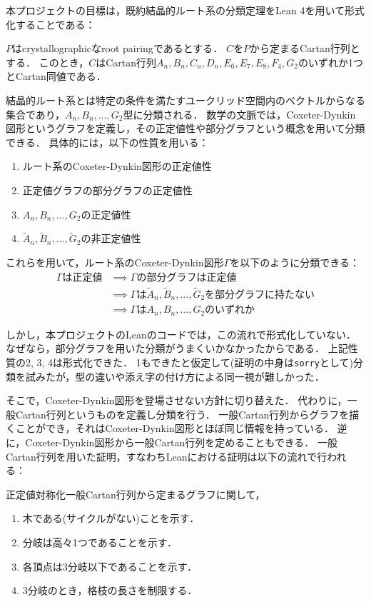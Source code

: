 本プロジェクトの目標は，既約結晶的ルート系の分類定理をLean 4を用いて形式化することである：
\begin{theorem*}
  \label{thm:classification_root}
  \leanok
  \uses{}
  $P$はcrystallographicなroot pairingであるとする．
  $C$を$P$から定まるCartan行列とする．
  このとき，$C$はCartan行列$A_n, B_n, C_n, D_n, E_6, E_7, E_8, F_4, G_2$のいずれか1つとCartan同値である．
\end{theorem*}
結晶的ルート系とは特定の条件を満たすユークリッド空間内のベクトルからなる集合であり，$A_n, B_n, \ldots, G_2$型に分類される．
数学の文脈では，Coxeter-Dynkin図形というグラフを定義し，その正定値性や部分グラフという概念を用いて分類できる．
具体的には，以下の性質を用いる：
\begin{enumerate}
  \item ルート系のCoxeter-Dynkin図形の正定値性
  \item 正定値グラフの部分グラフの正定値性
  \item $A_n, B_n, \ldots, G_2$の正定値性
  \item $\widetilde{A}_n, \widetilde{B}_n, \ldots, \widetilde{G}_2$の非正定値性
\end{enumerate}
これらを用いて，ルート系のCoxeter-Dynkin図形$\Gamma$を以下のように分類できる：
\begin{align}
  \Gamma \textrm{は正定値}
  &\implies \Gamma \textrm{の部分グラフは正定値} \\
  &\implies \Gamma \textrm{は} \widetilde{A}_n, \widetilde{B}_n, \ldots, \widetilde{G}_2 \textrm{を部分グラフに持たない} \\
  &\implies \Gamma \textrm{は} A_n, B_n, \ldots, G_2 \textrm{のいずれか}
\end{align}

しかし，本プロジェクトのLeanのコードでは，この流れで形式化していない．
なぜなら，部分グラフを用いた分類がうまくいかなかったからである．
上記性質の2, 3, 4は形式化できた．
1もできたと仮定して(証明の中身は\texttt{sorry}として)分類を試みたが，型の違いや添え字の付け方による同一視が難しかった．

そこで，Coxeter-Dynkin図形を登場させない方針に切り替えた．
代わりに，一般Cartan行列というものを定義し分類を行う．
一般Cartan行列からグラフを描くことができ，それはCoxeter-Dynkin図形とほぼ同じ情報を持っている．
逆に，Coxeter-Dynkin図形から一般Cartan行列を定めることもできる．
一般Cartan行列を用いた証明，すなわちLeanにおける証明は以下の流れで行われる：

正定値対称化一般Cartan行列から定まるグラフに関して，
\begin{enumerate}
  \item 木である(サイクルがない)ことを示す．
  \item 分岐は高々1つであることを示す．
  \item 各頂点は3分岐以下であることを示す．
  \item 3分岐のとき，格枝の長さを制限する．
\end{enumerate}

